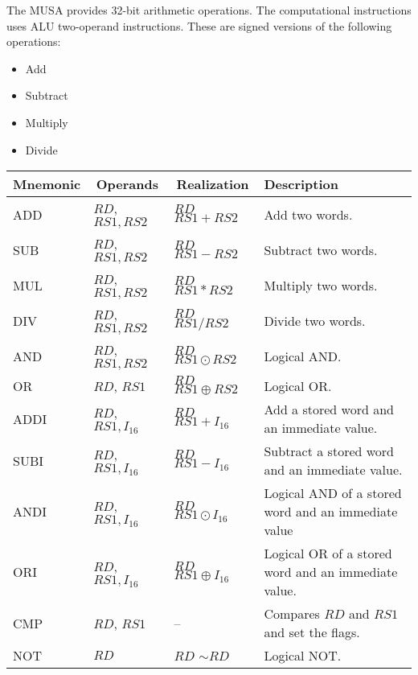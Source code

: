 \documentclass{article}
\begin{document}
  The MUSA provides 32-bit arithmetic operations. The computational instructions uses ALU two-operand instructions. These are signed versions of the following operations:

  \begin{itemize}
   \item Add
   \item Subtract
   \item Multiply
   \item Divide
  \end{itemize}
  
 \FloatBarrier
  \begin{table}[H]
    \begin{center}
      \begin{tabular}[pos]{| l | l | l | m{5cm} |} \hline 	
      \multicolumn{1}{|c|}{\cellcolor[gray]{0.9}\textbf{Mnemonic}} &
      \multicolumn{1}{c|}{\cellcolor[gray]{0.9}\textbf{Operands}} &
      \multicolumn{1}{c|}{\cellcolor[gray]{0.9}\textbf{Realization}} &
      \multicolumn{1}{m{5cm}|}{\cellcolor[gray]{0.9}\textbf{Description}} \\ \hline
	ADD  	& $RD$, $RS1, RS2$ 	& $RD$ \textleftarrow $RS1 + RS2$ 	& Add two words. 			\\ \hline
	SUB 	& $RD$, $RS1, RS2$ 	& $RD$ \textleftarrow $RS1 - RS2$ 	& Subtract two words. 		\\ \hline
	MUL 	& $RD$, $RS1, RS2$ 	& $RD$ \textleftarrow $RS1 * RS2$ 	& Multiply two words.		\\ \hline
	DIV   	& $RD$, $RS1, RS2$ 	& $RD$ \textleftarrow $RS1 / RS2$ 	& Divide two words.		\\ \hline
	AND  	& $RD$, $RS1, RS2$ 	& $RD$ \textleftarrow $RS1 \odot RS2$ 	& Logical AND.		\\ \hline
	OR 	    & $RD$, $RS1$ 	    & $RD$ \textleftarrow $RS1 \oplus RS2$ 	& Logical OR.	\\ \hline
	ADDI  	& $RD$, $RS1, I_{16}$ 	& $RD$ \textleftarrow $RS1 + I_{16}$ 	& Add a stored word and an \mbox{immediate} value. \\ \hline
	SUBI 	& $RD$, $RS1, I_{16}$ 	& $RD$ \textleftarrow $RS1 - I_{16}$ 	& Subtract a stored word and an immediate value.\\ \hline
	ANDI 	& $RD$, $RS1, I_{16}$ 	& $RD$ \textleftarrow $RS1 \odot I_{16}$ 	& Logical AND of a stored word and an immediate value		\\ \hline
	ORI   	& $RD$, $RS1, I_{16}$ 	& $RD$ \textleftarrow $RS1 \oplus I_{16}$ 	& Logical OR of a stored word and an immediate value.		\\ \hline	
	CMP 	& $RD$, $RS1$ 	    & -- 					            & Compares $RD$ and $RS1$ and set the flags.\\ \hline
	NOT 	& $RD$ 	            & $RD$ \textleftarrow $\sim RD$     & Logical NOT.	\\ \hline
      \end{tabular}
    \end{center}
  \end{table} 
  
\end{document}
